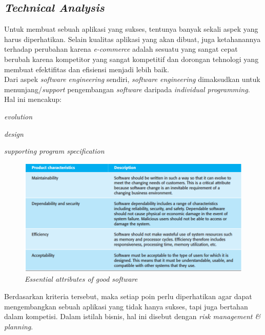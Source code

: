 
	\subsection{\textit{Technical Analysis}}
	\label{tech-analysis}
	
	Untuk membuat sebuah aplikasi yang sukses, tentunya banyak sekali aspek yang harus diperhatikan. Selain kualitas aplikasi yang akan dibuat, juga ketahanannya terhadap perubahan karena \textit{e-commerce} adalah sesuatu yang sangat cepat berubah karena kompetitor yang sangat kompetitif dan dorongan tehnologi yang membuat efektifitas dan efisiensi menjadi lebih baik.\\
	
	\indent Dari aspek \textit{software engineering} sendiri, \textit{software engineering} dimaksudkan untuk menunjang/\textit{support} pengembangan \textit{software} daripada \textit{individual programming}. Hal ini mencakup: \begin{inlinelist}
		\item \textit{evolution}
		\item \textit{design}
		\item \textit{supporting program specification}
	\end{inlinelist} \cite{software-engineering}
	
	\begin{figure}[H]
		\centering
		\includegraphics[width=\textwidth]{images/bab3/buku/essential-good-software.png}
		\caption{\textit{Essential attributes of good software}}
		\label{essential-software}
	\end{figure}
	
	\indent Berdasarkan kriteria tersebut, maka setiap poin perlu diperhatikan agar dapat mengembangkan sebuah aplikasi yang tidak hanya sukses, tapi juga bertahan dalam kompetisi. Dalam istilah bisnis, hal ini disebut dengan \textit{risk management \& planning}.
	

